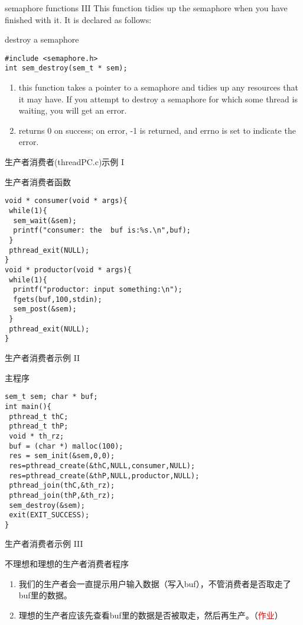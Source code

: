 \documentclass{beamer}
\begin{document}
\begin{frame}[fragile]{semaphore functions III}
This function tidies up the semaphore when you have finished with it. It is declared as follows:
\begin{block}{destroy a semaphore}
\begin{verbatim}
#include <semaphore.h>
int sem_destroy(sem_t * sem);
\end{verbatim}
\end{block}
\begin{enumerate}
\item
this function takes a pointer to a semaphore and tidies up any resources that it may have. If you attempt to destroy a semaphore for which some thread is waiting, you will get an error.
\item
returns 0 on success; on error, -1 is returned, and errno is set to indicate the error.
\end{enumerate}

\end{frame}
\begin{frame}[fragile]{生产者消费者(threadPC.c)示例 I}
\begin{block}{生产者消费者函数}
\begin{verbatim}
void * consumer(void * args){
 while(1){
  sem_wait(&sem);
  printf("consumer: the  buf is:%s.\n",buf);
 }
 pthread_exit(NULL);
}
void * productor(void * args){
 while(1){
  printf("productor: input something:\n");
  fgets(buf,100,stdin);
  sem_post(&sem);
 }
 pthread_exit(NULL);
}
\end{verbatim}
\end{block}
\end{frame}
\begin{frame}[fragile]{生产者消费者示例 II}
\begin{block}{主程序}
\begin{verbatim}
sem_t sem; char * buf;
int main(){
 pthread_t thC;
 pthread_t thP;
 void * th_rz;
 buf = (char *) malloc(100);
 res = sem_init(&sem,0,0);
 res=pthread_create(&thC,NULL,consumer,NULL);
 res=pthread_create(&thP,NULL,productor,NULL);
 pthread_join(thC,&th_rz);
 pthread_join(thP,&th_rz);
 sem_destroy(&sem);
 exit(EXIT_SUCCESS);
}
\end{verbatim}
\end{block}
\end{frame}
\begin{frame}[fragile]{生产者消费者示例 III}
\begin{block}{不理想和理想的生产者消费者程序}
\begin{enumerate}
\item
我们的生产者会一直提示用户输入数据（写入buf），不管消费者是否取走了buf里的数据。
\item
理想的生产者应该先查看buf里的数据是否被取走，然后再生产。（\textcolor{red}{作业}）
\end{enumerate}
\end{block}
\end{frame}
\end{document}
